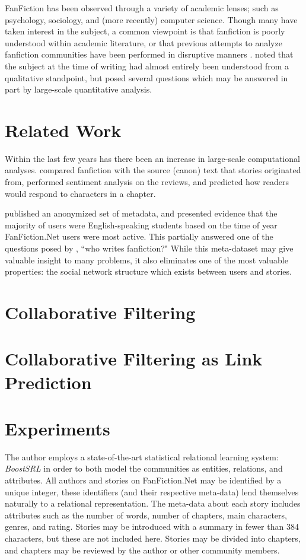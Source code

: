 \documentclass[letterpaper]{article}
\begin{document}
FanFiction has been observed through a variety of academic lenses; such as psychology, sociology, and (more recently) computer science. Though many have taken interest in the subject, a common viewpoint is that fanfiction is poorly understood within academic literature, or that previous attempts to analyze fanfiction communities have been performed in disruptive manners \cite{larsen2011fandom}. \cite{barnes2015fanfiction} noted that the subject at the time of writing had almost entirely been understood from a qualitative standpoint, but posed several questions which may be answered in part by large-scale quantitative analysis.

\section{Related Work}

Within the last few years has there been an increase in large-scale computational analyses. \cite{milli2016beyond} compared fanfiction with the source (canon) text that stories originated from, performed sentiment analysis on the reviews, and predicted how readers would respond to characters in a chapter.

\cite{yin2017no} published an anonymized set of metadata, and presented evidence that the majority of users were English-speaking students based on the time of year FanFiction.Net users were most active.  This partially answered one of the questions posed by \cite{barnes2015fanfiction}, ``who writes fanfiction?"  While this meta-dataset may give valuable insight to many problems, it also eliminates one of the most valuable properties: the social network structure which exists between users and stories.

\section{Collaborative Filtering}

\section{Collaborative Filtering as Link Prediction}

\section{Experiments}

The author employs a state-of-the-art statistical relational learning system: \textit{BoostSRL} in order to both model the communities as entities, relations, and attributes. All authors and stories on FanFiction.Net may be identified by a unique integer, these identifiers (and their respective meta-data) lend themselves naturally to a relational representation. The meta-data about each story includes attributes such as the number of words, number of chapters, main characters, genres, and rating. Stories may be introduced with a summary in fewer than 384 characters, but these are not included here. Stories may be divided into chapters, and chapters may be reviewed by the author or other community members.
\end{document}
